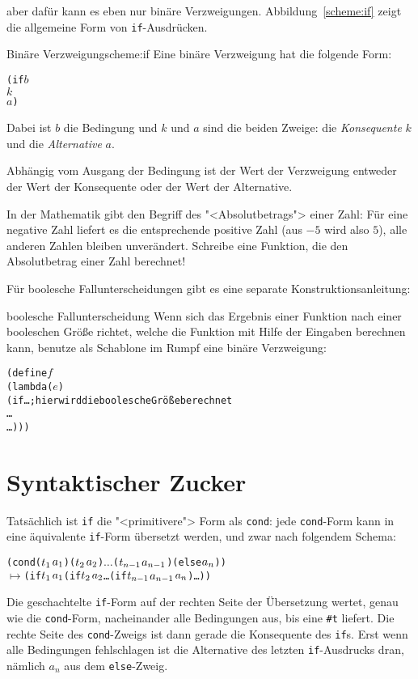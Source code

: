 aber dafür kann es eben nur binäre Verzweigungen.
Abbildung~\ref{scheme:if} zeigt die allgemeine Form von
\texttt{if}-Ausdrücken.
\begin{feature}{Binäre Verzweigung}{scheme:if}
  Eine binäre Verzweigung hat die folgende Form:
\begin{alltt}
(if \(b\)
    \(k\)
    \(a\))
\end{alltt}
Dabei ist $b$ die Bedingung und $k$ und $a$ sind die
beiden Zweige: die \textit{Konsequente} $k$ und die
\textit{Alternative} $a$.

Abhängig vom Ausgang der
Bedingung ist der Wert der Verzweigung entweder der Wert der Konsequente
oder der Wert der Alternative.
\end{feature}
%
\begin{aufgabe}
  In der Mathematik gibt den Begriff des "<Absolutbetrags"> einer
  Zahl: Für eine negative Zahl liefert es die entsprechende positive
  Zahl (aus $-5$ wird also $5$), alle anderen Zahlen bleiben
  unverändert.  Schreibe eine Funktion, die den Absolutbetrag einer
  Zahl berechnet!
\end{aufgabe}
%
Für boolesche Fallunterscheidungen gibt es eine separate
Konstruktionsanleitung:
%
\begin{konstruktionsanleitung}{boolesche Fallunterscheidung}
  \label{ka:boolesche-fallunterscheidung}
  Wenn sich das Ergebnis einer Funktion nach einer booleschen Größe
  richtet, welche die Funktion mit Hilfe der Eingaben berechnen kann,
  benutze als Schablone im Rumpf eine binäre Verzweigung:
\begin{alltt}
(define \(f\)
  (lambda (\(e\))
    (if \ldots ; \textrm{hier wird die boolesche Größe berechnet}
        \ldots
        \ldots)))
\end{alltt}
\end{konstruktionsanleitung}

\section{Syntaktischer Zucker}

Tatsächlich ist \texttt{if} die "<primitivere"> Form als
\texttt{cond}: jede \texttt{cond}-Form kann in eine äquivalente
\texttt{if}-Form übersetzt werden, und zwar nach
folgendem Schema:
%
\begin{alltt}
(cond (\(t\sb{1}\) \(a\sb{1}\)) (\(t\sb{2}\) \(a\sb{2}\)) \(\ldots\) (\(t\sb{n-1}\) \(a\sb{n-1}\)) (else \(a\sb{n}\)))
  \(\mapsto\) (if \(t\sb{1}\) \(a\sb{1}\) (if \(t\sb{2}\) \(a\sb{2}\) \ldots (if \(t\sb{n-1}\) \(a\sb{n-1}\) \(a\sb{n}\))\ldots))
\end{alltt}
%
Die geschachtelte \texttt{if}-Form auf der rechten Seite der
Übersetzung wertet, genau wie die \texttt{cond}-Form, nacheinander
alle Bedingungen aus, bis eine \verb|#t| liefert.  Die rechte Seite des
\texttt{cond}-Zweigs ist dann gerade die Konsequente des \texttt{if}s.
Erst wenn alle Bedingungen fehlschlagen ist die Alternative des letzten
\texttt{if}-Ausdrucks dran, nämlich $a_n$ aus dem \texttt{else}-Zweig.

